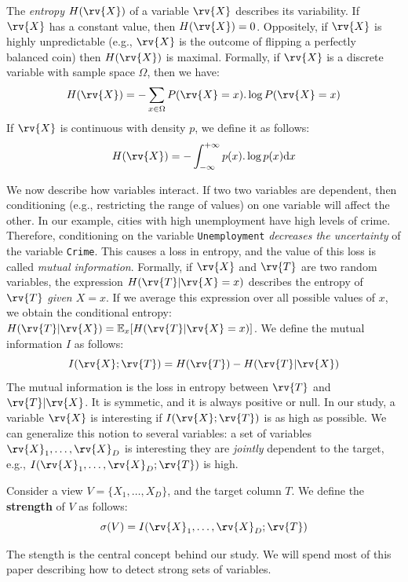 The \emph{entropy} $H(\rv{X})$ of a variable $\rv{X}$ describes its
variability. If $\rv{X}$ has a constant value, then $H(\rv{X}) = 0$.
Oppositely, if $\rv{X}$ is highly unpredictable (e.g., $\rv{X}$ is
the outcome of flipping a perfectly balanced coin) then $H(\rv{X})$ is
maximal. Formally, if $\rv{X}$ is a discrete variable with sample space
$\Omega$, then we have:
\begin{equation}\label{eq:ent-disc}
    H(\rv{X}) = - \sum_{x\in \Omega} P(\rv{X} = x).\log{P(\rv{X} = x)}
\end{equation}
If $\rv{X}$ is continuous with density $p$, we define it as follows:
\begin{equation}\label{eq:ent-cont}
    H(\rv{X}) = - \int_{-\infty}^{+\infty} p(x).\log{p(x)}\mathrm{d}x
\end{equation}

We now describe how variables interact. If two two variables are dependent,
then conditioning (e.g., restricting the range of values) on one variable will
affect the other. In our example, cities with high unemployment have high
levels of crime.  Therefore, conditioning on the variable \texttt{Unemployment}
\emph{decreases the uncertainty} of the variable \texttt{Crime}. This causes a
loss in entropy, and the value of this loss is called \emph{mutual
information}.  Formally, if $\rv{X}$ and $\rv{T}$ are two random variables, the
expression $H(\rv{T} | \rv{X} = x)$ describes the entropy of $\rv{T}$
\emph{given $X = x$}. If we average this expression over all possible values of
$x$, we obtain the conditional entropy: $H(\rv{T}|\rv{X}) = \mathbb{E}_{x}
[H(\rv{T} | \rv{X} = x)]$. We define the mutual information $I$ as follows:
\begin{equation}\label{eq:mut-inf}
    I(\rv{X}; \rv{T}) = H(\rv{T}) - H(\rv{T} | \rv{X})
\end{equation}
The mutual information is the loss in entropy between $\rv{T}$ and
$\rv{T} | \rv{X}$. It is symmetic, and it is always positive or null. In our
study, a variable $\rv{X}$ is interesting if $I(\rv{X}; \rv{T})$ is as high as
possible.  We can generalize this notion to several variables: a set of
variables $\rv{X}_1, \ldots, \rv{X}_D$ is interesting they are \emph{jointly}
dependent to the target, e.g., $I(\rv{X}_1, \ldots, \rv{X}_D ; \rv{T})$ is
high.
\begin{definition}
Consider a view $V = \{X_1, \ldots, X_D\}$, and the target column $T$. We
define the \textbf{strength} of $V$ as follows: 
\begin{equation}\label{eq:strength}
    \sigma(V) = I(\rv{X}_1, \ldots, \rv{X}_D ; \rv{T})
\end{equation}
\end{definition} 
The stength is the central concept behind our study. We will spend most of this
paper describing how to detect strong sets of variables.


